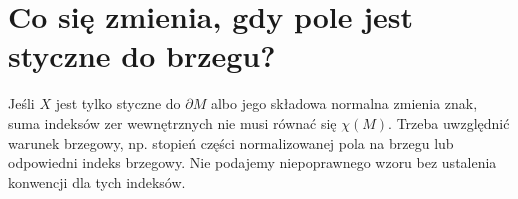 \section{Co się zmienia, gdy pole jest styczne do brzegu?}
\begin{uwaga}
Jeśli $X$ jest tylko styczne do $\partial M$ albo jego
składowa normalna zmienia znak, suma indeksów zer wewnętrznych
nie musi równać się $\chi(M)$. Trzeba uwzględnić warunek
brzegowy, np. stopień części normalizowanej pola na brzegu
lub odpowiedni indeks brzegowy. Nie podajemy niepoprawnego
wzoru bez ustalenia konwencji dla tych indeksów.
\end{uwaga}






